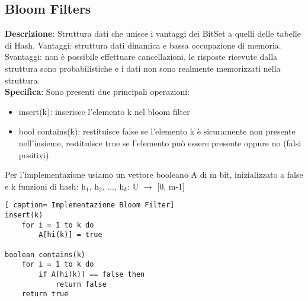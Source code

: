 \documentclass[../cheatSheetAlgoritmi.tex]{subfiles}
\begin{document}
\subsection{Bloom Filters}
\textbf{Descrizione}: Struttura dati che unisce i vantaggi dei BitSet a quelli delle tabelle di Hash. Vantaggi: struttura dati dinamica e bassa occupazione di memoria. Svantaggi: non è possibile effettuare cancellazioni, le risposte ricevute dalla struttura sono probabilistiche e i dati non sono realmente memorizzati nella struttura.\\
\textbf{Specifica}: Sono presenti due principali operazioni:
\begin{itemize}
 	\item insert(k): inserisce l'elemento k nel bloom filter 
 	\item bool contains(k): restituisce false se l'elemento k è sicuramente  non presente nell'insieme, restituisce true se l'elemento può essere presente oppure no (falsi positivi). 
\end{itemize}
Per l'implementazione usiamo un vettore booleano A di m bit, inizializzato a false e k funzioni di hash: h$_{1}$, h$_{2}$, ..., h$_{k}$: U $\rightarrow$ [0, m-1]\
\begin{lstlisting}[ caption= Implementazione Bloom Filter]
insert(k)
	for i = 1 to k do
		A[hi(k)] = true
		
boolean contains(k)
	for i = 1 to k do
		if A[hi(k)] == false then 
			return false
	return true
\end{lstlisting}
\end{document}

